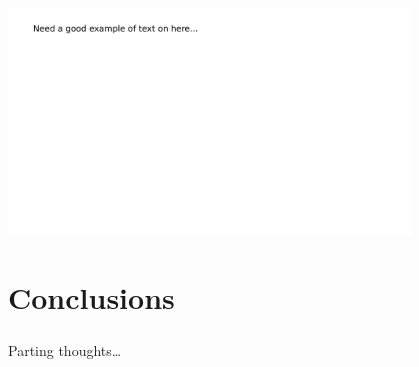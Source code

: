 \documentclass{beamer}
\begin{document}
\begin{frame} \frametitle{\insertsection}
    \centering\includegraphics[width=0.8\textwidth]{images/example}
\end{frame}

\section{Conclusions}

\begin{frame} \frametitle{\insertsection}

    Parting thoughts\ldots

\end{frame}
\end{document}

